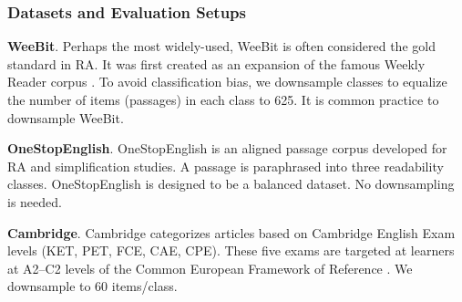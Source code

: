 \documentclass[11pt]{article}
\begin{document}
\subsubsection{Datasets and Evaluation Setups}
\begin{table}
\centering
{}
\caption{\label{Table 1} Statistics for datasets.}
\end{table}
\textbf{WeeBit}. Perhaps the most widely-used, WeeBit is often considered the gold standard in RA. It was first created as an expansion of the famous Weekly Reader corpus \citep{Feng:09}. To avoid classification bias, we downsample classes to equalize the number of items (passages) in each class to 625. It is common practice to downsample WeeBit.

\textbf{OneStopEnglish}. OneStopEnglish is an aligned passage corpus developed for RA and simplification studies. A passage is paraphrased into three readability classes. OneStopEnglish is designed to be a balanced dataset. No downsampling is needed.

\textbf{Cambridge}. Cambridge \citep{Xia:16} categorizes articles based on Cambridge English Exam levels (KET, PET, FCE, CAE, CPE). These five exams are targeted at learners at A2–C2 levels of the Common European Framework of Reference \citep{Xia:16}. We downsample to 60 items/class.
\end{document}
